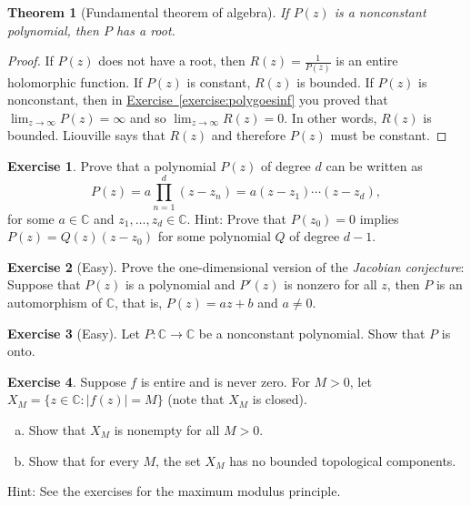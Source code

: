 \documentclass[12pt,openany]{book}
\newcommand{\sabs}[1]{\lvert {#1} \rvert}
\newcommand{\C}{{\mathbb{C}}}
\newcommand{\myindex}[1]{#1\index{#1}}
\theoremstyle{plain}
\newtheorem{thm}{Theorem}[section]
\theoremstyle{remark}
\theoremstyle{definition}
\newenvironment{exbox}{%
    \def\FrameCommand{\vrule width 1pt \relax\hspace{10pt}}%
    \MakeFramed{\advance\hsize-\width\FrameRestore}%
}{%
    \endMakeFramed
}
\newenvironment{exparts}{%
    \leavevmode\begin{enumerate}[a),noitemsep,topsep=0pt,parsep=0pt,partopsep=0pt]
}{%
    \end{enumerate}
}
\theoremstyle{exercise}
\newtheorem{exercise}{Exercise}[section]
\theoremstyle{example}
\newcommand{\exerciseref}[1]{\hyperref[#1]{Exercise~\ref*{#1}}}
\begin{document}
\begin{thm}[Fundamental theorem of algebra]
If $P(z)$ is a nonconstant polynomial, then $P$ has a root.
\end{thm}

\begin{proof}
If $P(z)$ does not have a root, then $R(z) = \frac{1}{P(z)}$ is
an entire holomorphic function.
If $P(z)$ is constant, $R(z)$ is bounded.
If $P(z)$ is nonconstant, then
in \exerciseref{exercise:polygoesinf} you proved that
$\lim_{z \to \infty} P(z) = \infty$ and so
$\lim_{z \to \infty} R(z) = 0$.  In other words, $R(z)$ is bounded.
Liouville says that $R(z)$ and therefore $P(z)$ must be constant.
\end{proof}

\begin{exbox}
\begin{exercise}
Prove that a polynomial $P(z)$ of degree $d$ can be written as
\begin{equation*}
P(z) = a \prod_{n=1}^d (z-z_n) = a (z-z_1) \cdots (z-z_d),
\end{equation*}
for some $a \in \C$ and $z_1,\ldots,z_d \in \C$.
Hint: Prove that $P(z_0) = 0$ implies $P(z) = Q(z) (z-z_0)$ for some
polynomial $Q$ of degree $d-1$.
\end{exercise}

\begin{exercise}[Easy]
Prove the one-dimensional version of the \emph{\myindex{Jacobian conjecture}}:
Suppose that $P(z)$ is a polynomial and $P'(z)$ is nonzero for all $z$,
then $P$ is an automorphism of $\C$, that is, $P(z) = az+b$ and $a \not= 0$.
\end{exercise}

\begin{exercise}[Easy]
Let $P \colon \C \to \C$ be a nonconstant polynomial.  Show that $P$ is
onto.
\end{exercise}

\begin{exercise}
Suppose $f$ is entire and is never zero.  For $M > 0$, let
$X_M = \bigl\{ z \in \C : \sabs{f(z)} = M \bigr\}$ (note that $X_M$
is closed).
\begin{exparts}
\item Show that $X_M$ is nonempty for all $M > 0$.
\item Show that for every $M$, the set $X_M$ has no bounded topological components.
\end{exparts}
Hint: See the exercises for the maximum modulus principle.
\end{exercise}
\end{exbox}
\end{document}
